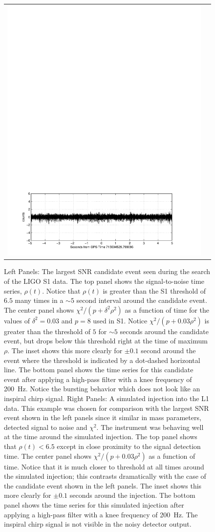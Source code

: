 \begin{figure}[p]
\begin{center}
\begin{tabular}{cc}
\includegraphics[width=0.475\linewidth]{figures/pipeline/injection-ts}
\end{tabular}
\end{center}
\caption{\label{f:s1loudest}%
Left Panels: The largest SNR candidate event seen during the search of the
LIGO S1 data. The top panel shows the signal-to-noise time series, $\rho(t)$.
Notice that $\rho(t)$ is greater than the S1 threshold of $6.5$ many times in
a  $\sim 5$ second interval around the candidate event.   The center panel
shows $\chi^2/ (p+ \delta^2 \rho^2)$ as a function of time for the values of
$\delta^2 = 0.03$ and $p = 8$ used in S1.  Notice $\chi^2 / (p+ 0.03 \rho^2)$
is greater than the threshold of $5$ for $\sim 5$ seconds around the candidate
event,  but drops below this threshold right at the time of maximum $\rho$.
The inset shows this more clearly for $\pm 0.1$ second around the event where
the threshold is indicated by a dot-dashed horizontal line.  The bottom panel
shows the time series for this candidate event after applying a high-pass
filter with a knee frequency of 200~Hz.  Notice the bursting behavior which
does not look like an inspiral chirp signal.  \break Right Panels: A simulated
injection into the L1 data.  This example was chosen for comparison with the
largest SNR event shown in the left panels since it similar in mass
parameters, detected signal to noise and $\chi^2$.   The instrument was
behaving well at the time around the simulated injection.  The top panel shows
that $\rho(t) < 6.5$ except in close proximity to the signal detection time.
The center panel shows $\chi^2/ (p+ 0.03 \rho^2)$ as a function of time.
Notice that it is much closer to threshold at all times around the simulated
injection; this contrasts dramatically with the case of the candidate event
shown in the left panels.  The inset shows this more clearly for $\pm 0.1$
seconds around the injection.  The bottom panel shows the time series for this
simulated injection after applying a high-pass filter with a knee frequency of
200~Hz.  The inspiral chirp signal is not visible in the noisy detector
output.}
\end{figure}

